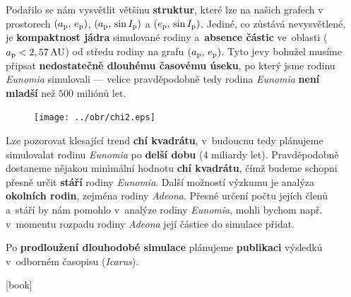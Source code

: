 \documentclass{beamer}
\newlength{\sep}
\newlength{\vyska}
\newlength{\vyskaC}
\newlength{\side}
\begin{document}
\begin{frame}
\begin{columns}[t]
\begin{column}{\side}
\begin{tcolorbox}[title=Závěry\phantom{Úy},height=0.38\vyskaC]
	Podařilo se nám vysvětlit většinu \textbf{struktur}, které lze na našich grafech v prostorech $(a_{\rm p},\,e_{\rm p})$, $(a_{\rm p},\,\sin I_{\rm p})$ a  $(e_{\rm p},\,\sin I_{\rm p})$. Jediné, co zůstává nevysvětlené, je \textbf{kompaktnost jádra} simulované rodiny a~\textbf{absence částic} ve~oblasti  ($a_{\rm p}<2,57\,{\rm AU}$) od středu rodiny na grafu $(a_{\rm p},\,e_{\rm p})$. Tyto jevy bohužel musíme připsat \textbf{nedostatečně dlouhému časovému úseku}, po který jsme rodinu \textit{Eunomia} simulovali --- velice pravděpodobně tedy rodina \textit{Eunomia} \textbf{není mladší} než $500$ miliónů let.
\end{tcolorbox}
\vspace{\sep}
\begin{tcolorbox}[title=Budoucí práce\phantom{Úy},height=0.3\vyskaC]
	\begin{figure}
		\centering
		\texttt{[image: ../obr/chi2.eps]}
	\end{figure}
	Lze pozorovat klesající trend \textbf{chí kvadrátu}, v~budoucnu tedy plánujeme simulovalat rodinu \textit{Eunomia} po \textbf{delší dobu} (4 miliardy let). Pravděpodobně dostaneme nějakou minimální hodnotu \textbf{chí kvadrátu}, čímž budeme schopni přesně určit \textbf{stáří} rodiny \textit{Eunomia}. Další možností výzkumu je analýza \textbf{okolních rodin}, zejména rodiny \textit{Adeona}. Přesné určení počtu jejích členů a~stáří by nám pomohlo v~analýze rodiny \textit{Eunomia}, mohli bychom např. v~momentu rozpadu rodiny \textit{Adeona} její částice do simulace přidat.

	Po \textbf{prodloužení dlouhodobé simulace} plánujeme \textbf{publikaci} výsledků v~odborném časopisu (\textit{Icarus}).

\end{tcolorbox}
\vspace{\sep}
\begin{tcolorbox}[title=Reference\phantom{Úy},height=0.32\vyskaC]
	\printbibliography

	\tcblower

	\newrefsection{}
	[book]
	\nocite{fmt}
	\nocite{murray00}
	\nocite{brozphd}
	\printbibliography
\end{tcolorbox}
\end{column}

\begin{column}{\sep}
\end{column}

\end{columns}
\end{frame}
\end{document}
